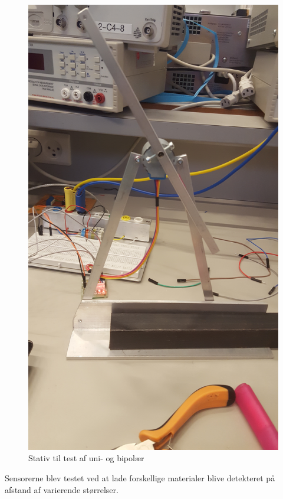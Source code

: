 \begin{figure}[H]
	\centerline{\includegraphics[scale=0.33]{tex/Test/Motor-sensor/HW_stativ_test.jpg}}
	\caption{Stativ til test af uni- og bipolær}
	\label{fig:HW_stativ_test}
\end{figure}

\noindent
Sensorerne blev testet ved at lade forskellige materialer blive detekteret på afstand af varierende størrelser.